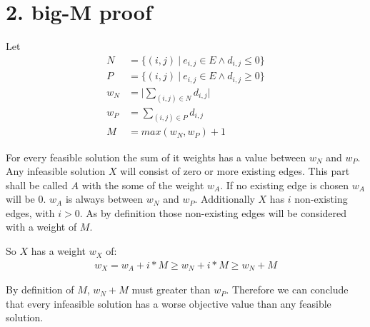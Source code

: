 \section*{2. big-M proof}
Let
\begin{align*}
N &= \{(i,j) \: | \: e_{i,j} \in E \wedge d_{i,j} \leq 0 \} \\
P &= \{(i,j) \: | \: e_{i,j} \in E \wedge d_{i,j} \geq 0 \} \\
w_N &= \lvert \sum_{(i,j) \in N} d_{i,j} \rvert \\ 
w_P &= \sum_{(i,j) \in P} d_{i,j} \\ 
\textit{M} &= max( w_N , w_P ) + 1
\end{align*}

For every feasible solution the sum of it weights has a value between $w_N$ and $w_P$. Any infeasible solution $X$ will consist of zero or more existing edges. This part shall be called $A$ with the some of the weight $w_A$. If no existing edge is chosen $w_A$ will be $0$. $w_A$ is always between $w_N$ and $w_P$. Additionally $X$ has $i$ non-existing edges, with $i>0$. As by definition those non-existing edges will be considered with a weight of $M$.

So $X$ has a weight $w_X$ of:
\begin{align*}
w_X = w_A + i * M \geq w_N + i * M \geq w_N + M
\end{align*}

By definition of $M$,  $w_N + M$ must greater than $w_P$. Therefore we can conclude that every infeasible solution has a worse objective value than any feasible solution.